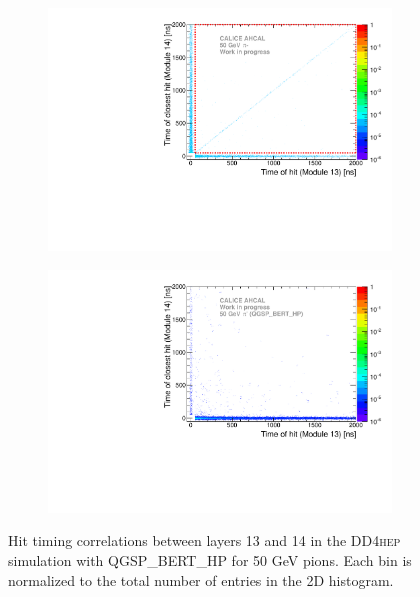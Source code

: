 \documentclass{JINST}
\newcommand\ddhep{\textsc{DD4hep}\xspace}
\begin{document}
\begin{figure}[htbp!]
  \begin{subfigure}[t]{0.49\textwidth}
    \centering
    \includegraphics[width=1\textwidth]{fig/Time_Correlation_long.pdf}
    \caption{} \label{fig:TimeCorr_Data_50GeV}
  \end{subfigure}
  \hfill
  \begin{subfigure}[t]{0.49\textwidth}
    \centering
    \includegraphics[width=1\textwidth]{fig/Time_Correlation_50GeV_long_QGSPBERTHP_DD4hep.pdf}
    \caption{} \label{fig:TimeCorr_Data_50GeV_Sim}
  \end{subfigure}
  \caption{Hit timing correlations between layers 13 and 14 in the \ddhep simulation with QGSP\_BERT\_HP for 50 GeV pions. Each bin is normalized to the total number of entries in the 2D histogram.}
  \label{fig:TimeCorr_50GeV}
\end{figure}
\end{document}
